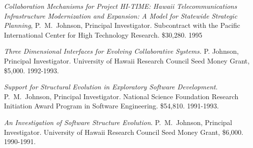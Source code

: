 \begin{Awarded Grant Support}
\item {\em Collaboration Mechanisms for Project HI-TIME: Hawaii
  Telecommunications Infrastructure Modernization and Expansion: A Model for
  Statewide Strategic Planning}, P.~M.~Johnson, Principal Investigator.
  Subcontract with the Pacific International Center for High Technology
  Research.  \$30,280. 1995

\item {\em Three Dimensional Interfaces for Evolving Collaborative Systems.} P.
  Johnson, Principal Investigator.  University of Hawaii Research Council
  Seed Money Grant, \$5,000. 1992-1993.
  
\item {\em Support for Structural Evolution in Exploratory Software
  Development}.  P.~M.~Johnson, Principal Investigator.  National Science
  Foundation Research Initiation Award Program in Software Engineering.
  \$54,810.  1991-1993.
  
\item {\em An Investigation of Software Structure Evolution}.
  P.~M.~Johnson, Principal Investigator.  University of Hawaii Research
  Council Seed Money Grant, \$6,000.  1990-1991.

\end{Awarded Grant Support}




